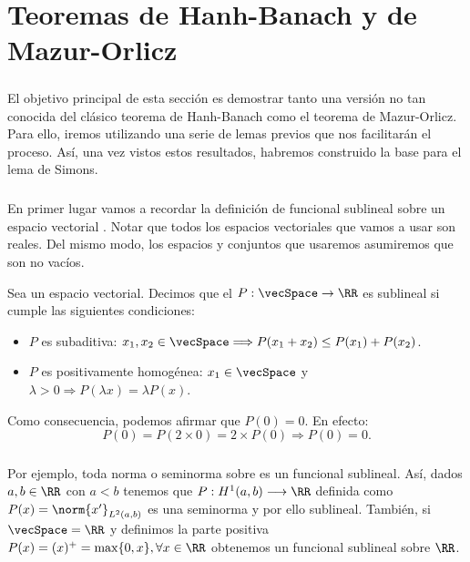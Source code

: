 \chapter{Teoremas de Hanh-Banach y de Mazur-Orlicz}
	\thispagestyle{empty}
	\paragraph{}El objetivo principal de esta sección es demostrar tanto una versión no tan conocida del clásico teorema de Hanh-Banach como el teorema de Mazur-Orlicz. Para ello, iremos utilizando una serie de lemas previos que nos facilitarán el proceso. Así, una vez vistos estos resultados, habremos construido la base para el lema de Simons.
	
	\paragraph{} En primer lugar vamos a recordar la definición de funcional sublineal sobre un espacio vectorial \vecSpace . Notar que todos los espacios vectoriales que vamos a usar son reales. Del mismo modo, los espacios y conjuntos que usaremos asumiremos que son no vacíos.
	
	\begin{definicion}
		Sea \vecSpace un espacio vectorial. Decimos que el $P:\vecSpace \rightarrow \RR$ es sublineal si cumple las siguientes condiciones:
		\begin{itemize}
			\item $ P $ es subaditiva: $x_1, x_2 \in \vecSpace \Longrightarrow P(x_1 + x_2) \leq P(x_1) + P(x_2) $.
			\item $ P $ es positivamente homogénea: $x_1 \in \vecSpace $ y $ \lambda > 0 \Longrightarrow P(\lambda x) = \lambda P(x) $.
		\end{itemize}
	\end{definicion}

	Como consecuencia, podemos afirmar que $ P(0) = 0 $. En efecto:
	\[
	P(0) = P(2\times0) = 2\times P(0) \Longrightarrow P(0) = 0.
	\]
	\paragraph{}Por ejemplo, toda norma o seminorma sobre \vecSpace es un funcional sublineal. Así, dados $ a,b \in \RR $ con $ a <b $ tenemos que $ P:H^{1} (a,b) \longrightarrow \RR$ definida como $ P(x) = \norm{x'}_{L^2(a,b)} $ es una seminorma y por ello sublineal. También, si $ \vecSpace = \RR $ y definimos la parte positiva $ P(x) = (x)^{+} = \max \{0,x\}, \forall x \in \RR $ obtenemos un funcional sublineal sobre $\RR$.
	
